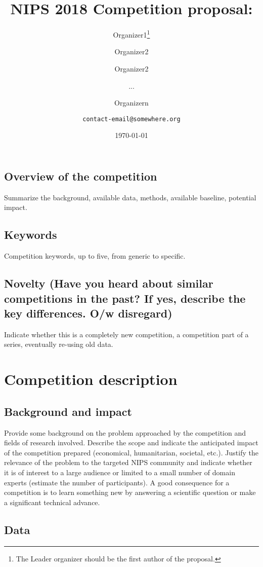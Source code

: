 \documentclass[11pt, oneside]{article}
\title{NIPS 2018 Competition proposal:}
\author{Organizer1\thanks{The Leader organizer should be the first author of the proposal.} \and Organizer2 \and Organizer2 \and ... \and Organizern \\ \and
{\tt contact-email@somewhere.org}\\
}
\date{\today}
\begin{document}
\maketitle

\subsection{Overview of the competition}
Summarize the background, available data, methods, available baseline, potential impact.


\subsection{Keywords}
Competition keywords, up to five, from generic to specific.

\subsection{Novelty (Have you heard about similar competitions in the past? If yes, describe the key differences. O/w disregard)}

Indicate whether this is a completely new competition, a competition part of a series, eventually re-using old data.

\section{Competition description}

\subsection{Background and impact}

Provide some background on the problem approached by the competition and fields of research involved. Describe the scope and indicate the anticipated impact of the competition prepared (economical, humanitarian, societal, etc.). Justify the relevance of the problem to the targeted NIPS community and indicate whether it is of interest to a large audience or limited to a small number of domain experts (estimate the number of participants). A good consequence for a competition is to learn something new by answering a scientific question or make a significant technical advance.

\subsection{Data}
\end{document}

